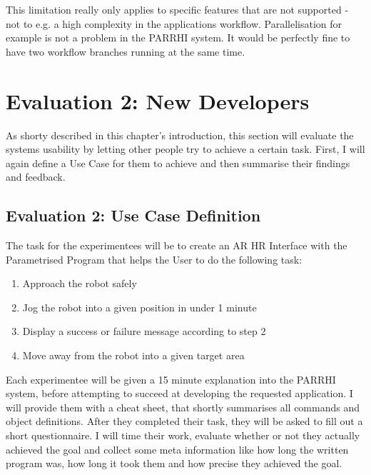 This limitation really only applies to specific features that are not supported - not to e.g. a high complexity in the applications workflow. Parallelisation for example is not a problem in the PARRHI system. It would be perfectly fine to have two workflow branches running at the same time. 

\section{Evaluation 2: New Developers}
As shorty described in this chapter's introduction, this section will evaluate the systems usability by letting other people try to achieve a certain task. First, I will again define a Use Case for them to achieve and then summarise their findings and feedback.

\subsection{Evaluation 2: Use Case Definition}
The task for the experimentees will be to create an AR HR Interface with the Parametrised Program that helps the User to do the following task:
\begin{enumerate}
	\item Approach the robot safely
	\item Jog the robot into a given position in under 1 minute
	\item Display a success or failure message according to step 2
	\item Move away from the robot into a given target area
\end{enumerate} 

Each experimentee will be given a 15 minute explanation into the PARRHI system, before attempting to succeed at developing the requested application. I will provide them with a cheat sheet, that shortly summarises all commands and object definitions. After they completed their task, they will be asked to fill out a short questionnaire. I will time their work, evaluate whether or not they actually achieved the goal and collect some meta information like how long the written program was, how long it took them and how precise they achieved the goal. 











